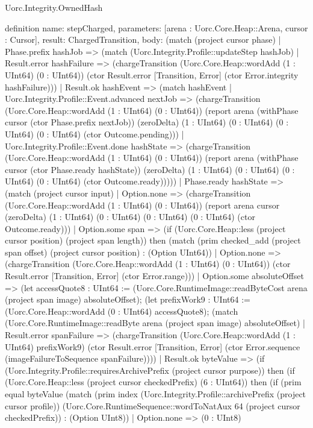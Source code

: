 \begin{lexlean}{Uorc.Integrity.OwnedHash}
\begin{semanticmodule}
definition{
  name: stepCharged,
  parameters: [arena : Uorc.Core.Heap::Arena, cursor : Cursor],
  result: ChargedTransition,
  body: (match (project cursor phase)
    | Phase.prefix hashJob => (match (Uorc.Integrity.Profile::updateStep hashJob)
      | Result.error hashFailure => (chargeTransition (Uorc.Core.Heap::wordAdd (1 : UInt64) (0 : UInt64)) (ctor Result.error [Transition, Error] (ctor Error.integrity hashFailure)))
      | Result.ok hashEvent => (match hashEvent
        | Uorc.Integrity.Profile::Event.advanced nextJob => (chargeTransition (Uorc.Core.Heap::wordAdd (1 : UInt64) (0 : UInt64)) (report arena (withPhase cursor (ctor Phase.prefix nextJob)) (zeroDelta) (1 : UInt64) (0 : UInt64) (0 : UInt64) (0 : UInt64) (ctor Outcome.pending)))
        | Uorc.Integrity.Profile::Event.done hashState => (chargeTransition (Uorc.Core.Heap::wordAdd (1 : UInt64) (0 : UInt64)) (report arena (withPhase cursor (ctor Phase.ready hashState)) (zeroDelta) (1 : UInt64) (0 : UInt64) (0 : UInt64) (0 : UInt64) (ctor Outcome.ready)))))
    | Phase.ready hashState => (match (project cursor input)
      | Option.none => (chargeTransition (Uorc.Core.Heap::wordAdd (1 : UInt64) (0 : UInt64)) (report arena cursor (zeroDelta) (1 : UInt64) (0 : UInt64) (0 : UInt64) (0 : UInt64) (ctor Outcome.ready)))
      | Option.some span => (if (Uorc.Core.Heap::less (project cursor position) (project span length)) then (match (prim checked_add (project span offset) (project cursor position) : (Option UInt64))
        | Option.none => (chargeTransition (Uorc.Core.Heap::wordAdd (1 : UInt64) (0 : UInt64)) (ctor Result.error [Transition, Error] (ctor Error.range)))
        | Option.some absoluteOffset => (let accessQuote8 : UInt64 := (Uorc.Core.RuntimeImage::readByteCost arena (project span image) absoluteOffset); (let prefixWork9 : UInt64 := (Uorc.Core.Heap::wordAdd (0 : UInt64) accessQuote8); (match (Uorc.Core.RuntimeImage::readByte arena (project span image) absoluteOffset)
          | Result.error spanFailure => (chargeTransition (Uorc.Core.Heap::wordAdd (1 : UInt64) prefixWork9) (ctor Result.error [Transition, Error] (ctor Error.sequence (imageFailureToSequence spanFailure))))
          | Result.ok byteValue => (if (Uorc.Integrity.Profile::requiresArchivePrefix (project cursor purpose)) then (if (Uorc.Core.Heap::less (project cursor checkedPrefix) (6 : UInt64)) then (if (prim equal byteValue (match (prim index (Uorc.Integrity.Profile::archivePrefix (project cursor profile)) (Uorc.Core.RuntimeSequence::wordToNatAux 64 (project cursor checkedPrefix)) : (Option UInt8))
            | Option.none => (0 : UInt8)
}
\end{semanticmodule}
\end{lexlean}
